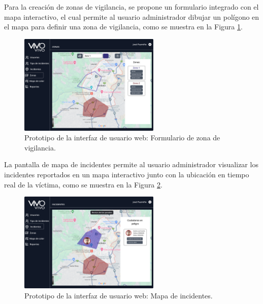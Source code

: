 Para la creación de zonas de vigilancia, se propone un formulario integrado con el mapa interactivo, el cual permite al usuario administrador
dibujar un polígono en el mapa para definir una zona de vigilancia, como se muestra en la Figura \ref{fig:prototipo-formulario-zona-vigilancia-web}.

\begin{figure}[H]
    \centering
    \includegraphics[width=0.6\textwidth]{chapters/III-resultados-y-discusion/resources/images/prototipo-formulario-zona-vigilancia-web.png}
    \caption{Prototipo de la interfaz de usuario web: Formulario de zona de vigilancia.}
    \label{fig:prototipo-formulario-zona-vigilancia-web}
\end{figure}

La pantalla de mapa de incidentes permite al usuario administrador visualizar los incidentes reportados en un mapa interactivo junto con la
ubicación en tiempo real de la víctima, como se muestra en la Figura \ref{fig:prototipo-mapa-incidentes-web}.

\begin{figure}[H]
    \centering
    \includegraphics[width=0.6\textwidth]{chapters/III-resultados-y-discusion/resources/images/prototipo-mapa-incidentes-web.png}
    \caption{Prototipo de la interfaz de usuario web: Mapa de incidentes.}
    \label{fig:prototipo-mapa-incidentes-web}
\end{figure}

